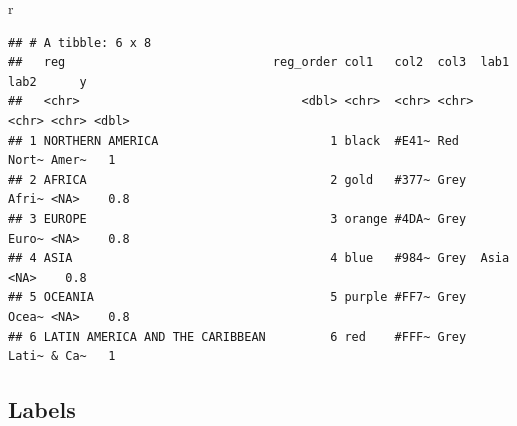 \documentclass[
]{book}
\newenvironment{Shaded}{\begin{snugshade}}{\end{snugshade}}
\newcommand{\NormalTok}[1]{#1}
\begin{document}
\begin{Shaded}
\begin{Highlighting}[]
\NormalTok{r}
\end{Highlighting}
\end{Shaded}

\begin{verbatim}
## # A tibble: 6 x 8
##   reg                             reg_order col1   col2  col3  lab1  lab2      y
##   <chr>                               <dbl> <chr>  <chr> <chr> <chr> <chr> <dbl>
## 1 NORTHERN AMERICA                        1 black  #E41~ Red   Nort~ Amer~   1  
## 2 AFRICA                                  2 gold   #377~ Grey  Afri~ <NA>    0.8
## 3 EUROPE                                  3 orange #4DA~ Grey  Euro~ <NA>    0.8
## 4 ASIA                                    4 blue   #984~ Grey  Asia  <NA>    0.8
## 5 OCEANIA                                 5 purple #FF7~ Grey  Ocea~ <NA>    0.8
## 6 LATIN AMERICA AND THE CARIBBEAN         6 red    #FFF~ Grey  Lati~ & Ca~   1
\end{verbatim}

\hypertarget{labels-5}{%
\subsection{Labels}\label{labels-5}}
\end{document}
